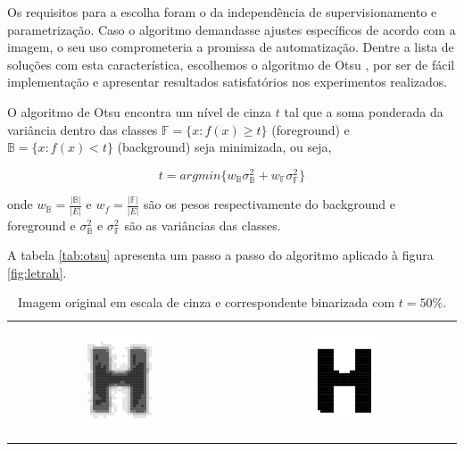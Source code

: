 \documentclass[a4paper,11pt]{article}
\begin{document}
    Os requisitos para a escolha foram o da independência de supervisionamento e parametrização. Caso o algoritmo demandasse ajustes específicos de acordo com a imagem, o seu uso comprometeria a promissa de automatização. Dentre a lista de soluções com esta característica, escolhemos o algoritmo de Otsu \cite{1979:ots}, por ser de fácil implementação e apresentar resultados satisfatórios nos experimentos realizados.

    O algoritmo de Otsu encontra um nível de cinza $t$ tal que a soma ponderada da variância dentro das classes $\mathbb{F} = \{ x \colon f(x) \geq t \}$ (foreground) e $\mathbb{B} = \{ x \colon f(x) < t \}$ (background) seja minimizada, ou seja,

    \begin{equation}
      t = argmin \{ w_\mathbb{B} \sigma^{2}_{\mathbb{B}} + w_\mathbb{F} \sigma^{2}_{\mathbb{F}} \}
    \end{equation}

    onde $w_\mathbb{B} = \frac{|\mathbb{B}|}{|E|}$ e $w_f = \frac{|\mathbb{F}|}{|E|}$ são os pesos respectivamente do background e foreground e $\sigma^{2}_{\mathbb{B}}$ e $\sigma^{2}_{\mathbb{F}}$ são as variâncias das classes.

    A tabela \ref{tab:otsu} apresenta um passo a passo do algoritmo aplicado à figura \ref{fig:letrah}.

    
    \begin{table}[ht]
      \begin{center}
        \caption{Imagem original em escala de cinza e correspondente binarizada com $t = 50\%.$}
        \begin{tabular}{ c c }
            \includegraphics[width=0.3\textwidth]{assets/binarization/h_3grayscale_big.png}
            \label{fig:letrah}
            &
            \includegraphics[width=0.3\textwidth]{assets/binarization/bin_big.png}
            
            \label{fig:letrah_bin}
        \end{tabular}
      \end{center}
    \end{table}
\end{document}
